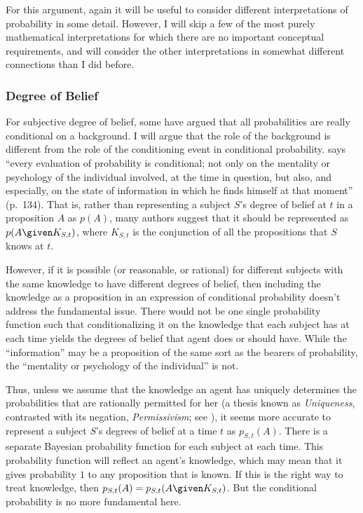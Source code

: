 For this argument, again it will be useful to consider different interpretations of probability in some detail. However, I will skip a few of the most purely mathematical interpretations for which there are no important conceptual requirements, and will consider the other interpretations in somewhat different connections than I did before.

\subsubsection{Degree of Belief}

For subjective degree of belief, some have argued that all probabilities are really conditional on a background. I will argue that the role of the background is different from the role of the conditioning event in conditional probability.  says ``every evaluation of probability is conditional; not only on the mentality or psychology of the individual involved, at the time in question, but also, and especially, on the state of information in which he finds himself at that moment'' (p.\ 134). That is, rather than representing a subject $S$'s degree of belief at $t$ in a proposition $A$ as $p(A)$, many authors suggest that it should be represented as $p(A \given K_{S,t})$, where $K_{S,t}$ is the conjunction of all the propositions that $S$ knows at $t$.

However, if it is possible (or reasonable, or rational) for different subjects with the same knowledge to have different degrees of belief, then including the knowledge as a proposition in an expression of conditional probability doesn't address the fundamental issue. There would not be one single probability function such that conditionalizing it on the knowledge that each subject has at each time yields the degrees of belief that agent does or should have. While the ``information'' may be a proposition of the same sort as the bearers of probability, the ``mentality or psychology of the individual'' is not.

Thus, unless we assume that the knowledge an agent has uniquely determines the probabilities that are rationally permitted for her (a thesis known as \textit{Uniqueness}, contrasted with its negation, \textit{Permissivism}; see \citealp{titelkopecunique}), it seems more accurate to represent a subject $S$'s degrees of belief at a time $t$ as $p_{S,t}(A)$. There is a separate Bayesian probability function for each subject at each time. This probability function will reflect an agent's knowledge, which may mean that it gives probability $1$ to any proposition that is known. If this is the right way to treat knowledge, then $p_{S,t}(A)=p_{S,t}(A \given K_{S,t})$. But the conditional probability is no more fundamental here.

